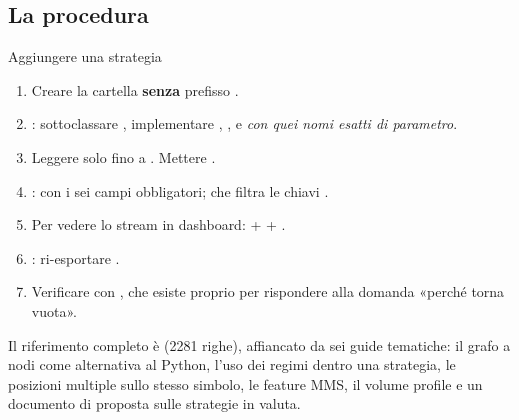 \subsection{La procedura}

\begin{pratica}{Aggiungere una strategia}
\begin{enumerate}
  \item Creare la cartella \textbf{senza} prefisso \cod{\_}.
  \item {}: sottoclassare ,
        implementare , ,
         e  \emph{con quei nomi esatti
        di parametro}.
  \item Leggere solo fino a . Mettere
        .
  \item {}:  con i
        sei campi obbligatori;  che filtra le chiavi
        .
  \item Per vedere lo stream in dashboard:  +
         + .
  \item {}: ri-esportare .
  \item Verificare con , che esiste
        proprio per rispondere alla domanda «perché
         torna vuota».
\end{enumerate}
\end{pratica}

\noindent
Il riferimento completo è 
(\num{2281} righe), affiancato da sei guide tematiche: il grafo a nodi come
alternativa al Python, l'uso dei regimi dentro una strategia, le posizioni
multiple sullo stesso simbolo, le feature MMS, il volume profile e un
documento di proposta sulle strategie in valuta.
